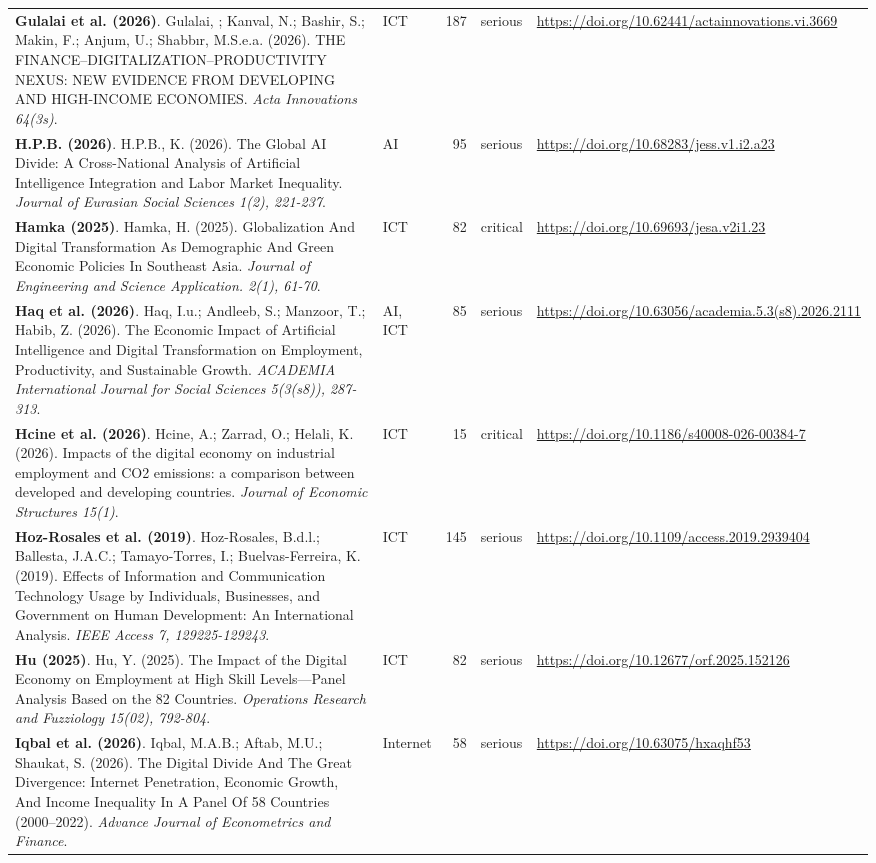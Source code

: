 {\begin{longtable}{@{}p{7.4cm} p{1.3cm} r l p{3.4cm}@{}}
\textbf{Gulalai et al. (2026)}. Gulalai, ; Kanval, N.; Bashir, S.; Makin, F.; Anjum, U.; Shabbır, M.S.e.a. (2026). THE FINANCE–DIGITALIZATION–PRODUCTIVITY NEXUS: NEW EVIDENCE FROM DEVELOPING AND HIGH-INCOME ECONOMIES. \emph{Acta Innovations 64(3s)}. & ICT & 187 & serious & \url{https://doi.org/10.62441/actainnovations.vi.3669} \\
\textbf{H.P.B. (2026)}. H.P.B., K. (2026). The Global AI Divide: A Cross-National Analysis of Artificial Intelligence Integration and Labor Market Inequality. \emph{Journal of Eurasian Social Sciences 1(2), 221-237}. & AI & 95 & serious & \url{https://doi.org/10.68283/jess.v1.i2.a23} \\
\textbf{Hamka (2025)}. Hamka, H. (2025). Globalization And Digital Transformation As Demographic And Green Economic Policies In Southeast Asia. \emph{Journal of Engineering and Science Application. 2(1), 61-70}. & ICT & 82 & critical & \url{https://doi.org/10.69693/jesa.v2i1.23} \\
\textbf{Haq et al. (2026)}. Haq, I.u.; Andleeb, S.; Manzoor, T.; Habib, Z. (2026). The Economic Impact of Artificial Intelligence and Digital Transformation on Employment, Productivity, and Sustainable Growth. \emph{ACADEMIA International Journal for Social Sciences 5(3(s8)), 287-313}. & AI, ICT & 85 & serious & \url{https://doi.org/10.63056/academia.5.3(s8).2026.2111} \\
\textbf{Hcine et al. (2026)}. Hcine, A.; Zarrad, O.; Helali, K. (2026). Impacts of the digital economy on industrial employment and CO2 emissions: a comparison between developed and developing countries. \emph{Journal of Economic Structures 15(1)}. & ICT & 15 & critical & \url{https://doi.org/10.1186/s40008-026-00384-7} \\
\textbf{Hoz-Rosales et al. (2019)}. Hoz-Rosales, B.d.l.; Ballesta, J.A.C.; Tamayo-Torres, I.; Buelvas-Ferreira, K. (2019). Effects of Information and Communication Technology Usage by Individuals, Businesses, and Government on Human Development: An International Analysis. \emph{IEEE Access 7, 129225-129243}. & ICT & 145 & serious & \url{https://doi.org/10.1109/access.2019.2939404} \\
\textbf{Hu (2025)}. Hu, Y. (2025). The Impact of the Digital Economy on Employment at High Skill Levels—Panel Analysis Based on the 82 Countries. \emph{Operations Research and Fuzziology 15(02), 792-804}. & ICT & 82 & serious & \url{https://doi.org/10.12677/orf.2025.152126} \\
\textbf{Iqbal et al. (2026)}. Iqbal, M.A.B.; Aftab, M.U.; Shaukat, S. (2026). The Digital Divide And The Great Divergence: Internet Penetration, Economic Growth, And Income Inequality In A Panel Of 58 Countries (2000–2022). \emph{Advance Journal of Econometrics and Finance}. & Internet & 58 & serious & \url{https://doi.org/10.63075/hxaqhf53} \\

\end{longtable}}
